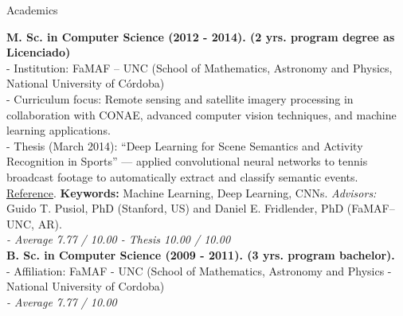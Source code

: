 \documentclass{resume}
\begin{document}

\begin{rSection}{Academics}

{\bf M. Sc. in Computer Science (2012 - 2014). (2 yrs. program degree as Licenciado)} \\ 
- Institution: FaMAF -- UNC (School of Mathematics, Astronomy and Physics, National University of Córdoba)\\
- Curriculum focus: Remote sensing and satellite imagery processing in collaboration with CONAE, advanced computer vision techniques, and machine learning applications.\\
- Thesis (March 2014): “Deep Learning for Scene Semantics and Activity Recognition in Sports” — applied convolutional neural networks to tennis broadcast footage to automatically extract and classify semantic events. \href{http://repositoriosdigitales.mincyt.gob.ar/vufind/Record/RDUUNC_0aec6058e869999c7224655c3c2c98bf}{Reference}. {\bf Keywords:} Machine Learning, Deep Learning, CNNs. {\it Advisors:} Guido T. Pusiol, PhD (Stanford, US) and Daniel E. Fridlender, PhD (FaMAF--UNC, AR). \\ 
{\it - Average 7.77 / 10.00 - Thesis 10.00 / 10.00}\\

{\bf B. Sc. in Computer Science (2009 - 2011). (3 yrs. program bachelor).} \\ 
- Affiliation: FaMAF - UNC (School of Mathematics, Astronomy and Physics - National University of Cordoba)\\
{\it - Average 7.77 / 10.00}\\


\end{rSection}

\end{document}
